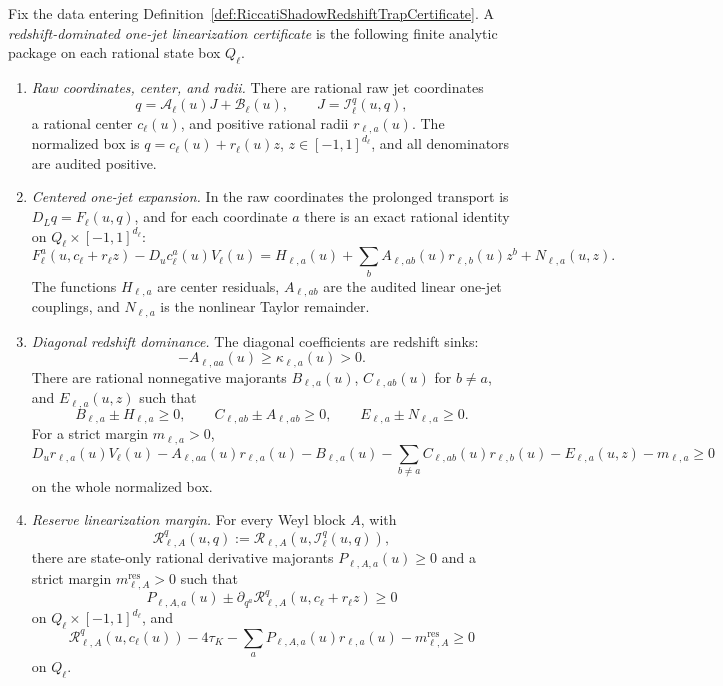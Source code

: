 \begin{definition}\label{def:RedshiftDominatedOneJetLinearizationCertificate}
Fix the data entering
Definition~\ref{def:RiccatiShadowRedshiftTrapCertificate}.  A
\emph{redshift-dominated one-jet linearization certificate} is the following
finite analytic package on each rational state box $Q_\ell$.
\begin{enumerate}
    \item \emph{Raw coordinates, center, and radii.}  There are rational raw
    jet coordinates
    \[
        q=\mathcal A_\ell(u)J+\mathcal B_\ell(u),
        \qquad J=\mathcal I_\ell^q(u,q),
    \]
    a rational center $c_\ell(u)$, and positive rational radii
    $r_{\ell,a}(u)$.  The normalized box is
    $q=c_\ell(u)+r_\ell(u)z$, $z\in[-1,1]^{d_\ell}$, and all denominators are
    audited positive.

    \item \emph{Centered one-jet expansion.}  In the raw coordinates the
    prolonged transport is $D_Lq=F_\ell(u,q)$, and for each coordinate $a$
    there is an exact rational identity on $Q_\ell\times[-1,1]^{d_\ell}$:
    \[
        F_\ell^a(u,c_\ell+r_\ell z)
        -D_uc_\ell^a(u)V_\ell(u)
        =
        H_{\ell,a}(u)
        +
        \sum_b A_{\ell,ab}(u)r_{\ell,b}(u)z^b
        +
        N_{\ell,a}(u,z).
    \]
    The functions $H_{\ell,a}$ are center residuals, $A_{\ell,ab}$ are the
    audited linear one-jet couplings, and $N_{\ell,a}$ is the nonlinear
    Taylor remainder.

    \item \emph{Diagonal redshift dominance.}  The diagonal coefficients are
    redshift sinks:
    \[
        -A_{\ell,aa}(u)\ge \kappa_{\ell,a}(u)>0 .
    \]
    There are rational nonnegative majorants $B_{\ell,a}(u)$,
    $C_{\ell,ab}(u)$ for $b\ne a$, and $E_{\ell,a}(u,z)$ such that
    \[
        B_{\ell,a}\pm H_{\ell,a}\ge0,\qquad
        C_{\ell,ab}\pm A_{\ell,ab}\ge0,\qquad
        E_{\ell,a}\pm N_{\ell,a}\ge0 .
    \]
    For a strict margin $m_{\ell,a}>0$,
    \[
        D_ur_{\ell,a}(u)V_\ell(u)
        -A_{\ell,aa}(u)r_{\ell,a}(u)
        -B_{\ell,a}(u)
        -\sum_{b\ne a}C_{\ell,ab}(u)r_{\ell,b}(u)
        -E_{\ell,a}(u,z)
        -m_{\ell,a}
        \ge0
    \]
    on the whole normalized box.

    \item \emph{Reserve linearization margin.}  For every Weyl block $A$,
    with
    \[
        \mathcal R_{\ell,A}^q(u,q)
        :=
        \mathcal R_{\ell,A}(u,\mathcal I_\ell^q(u,q)),
    \]
    there are state-only rational derivative majorants
    $P_{\ell,A,a}(u)\ge0$ and a strict margin
    $m_{\ell,A}^{\mathrm{res}}>0$ such that
    \[
        P_{\ell,A,a}(u)
        \pm
        \partial_{q^a}\mathcal R_{\ell,A}^q(u,c_\ell+r_\ell z)\ge0
    \]
    on $Q_\ell\times[-1,1]^{d_\ell}$, and
    \[
        \mathcal R_{\ell,A}^q(u,c_\ell(u))-4\tau_K
        -\sum_aP_{\ell,A,a}(u)r_{\ell,a}(u)
        -m_{\ell,A}^{\mathrm{res}}\ge0
    \]
    on $Q_\ell$.


\end{enumerate}
\end{definition}
